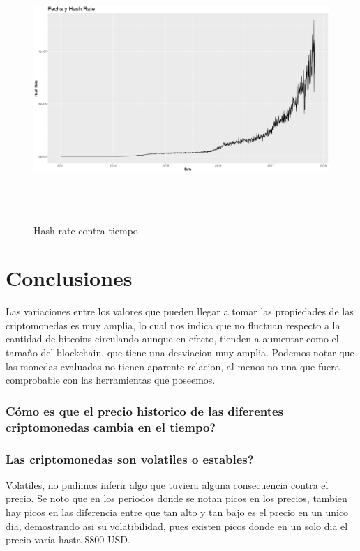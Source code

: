 \documentclass[12pt,letterpaper]{article}
\begin{document}
    \begin{figure}
        \centering

        \includegraphics[width = 18cm, height = 10cm]{btc/date_vs_hashRate}

        \caption{Hash rate contra tiempo}
    \end{figure}

\newpage
 
\section{Conclusiones}
	Las variaciones entre los valores que pueden llegar a tomar las propiedades de las criptomonedas es muy amplia, lo cual nos indica que no fluctuan respecto a la cantidad de bitcoins circulando aunque en efecto, tienden a aumentar como el tama\~no del blockchain, que tiene una desviacion muy amplia. Podemos notar que las monedas evaluadas no tienen aparente relacion, al menos no una que fuera comprobable con las herramientas que poseemos.
 	\subsubsection*{C\'omo es que el precio historico de las diferentes criptomonedas cambia en el tiempo?}
	
 	\subsubsection*{Las criptomonedas son volatiles o estables?}
	Volatiles, no pudimos inferir algo que tuviera alguna consecuencia contra el precio. Se noto que en los periodos donde se notan picos en los precios, tambien hay picos en las diferencia entre que tan alto y tan bajo es el precio en un unico dia, demostrando asi su volatibilidad, pues existen picos donde en un solo dia el precio var\'ia hasta \$800  USD.
\end{document}
